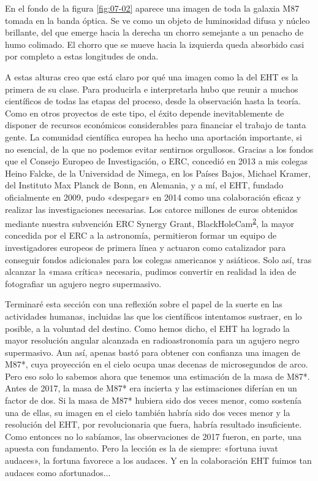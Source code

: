 En el fondo de la figura \ref{fig:07-02} aparece una imagen de toda la galaxia M87 tomada en la banda óptica. Se ve como un objeto de luminosidad difusa y núcleo brillante, del que emerge hacia la derecha un chorro semejante a un penacho de humo colimado. El chorro que se mueve hacia la izquierda queda absorbido casi por completo a estas longitudes de onda.

A estas alturas creo que está claro por qué una imagen como la del EHT es la primera de su clase. Para producirla e interpretarla hubo que reunir a muchos científicos de todas las etapas del proceso, desde la observación hasta la teoría. Como en otros proyectos de este tipo, el éxito depende inevitablemente de disponer de recursos económicos considerables para financiar el trabajo de tanta gente. La comunidad científica europea ha hecho una aportación importante, si no esencial, de la que no podemos evitar sentirnos orgullosos. Gracias a los fondos que el Consejo Europeo de Investigación, o ERC, concedió en 2013 a mis colegas Heino Falcke, de la Universidad de Nimega, en los Países Bajos, Michael Kramer, del Instituto Max Planck de Bonn, en Alemania, y a mí, el EHT, fundado oficialmente en 2009, pudo «despegar» en 2014 como una colaboración eficaz y realizar las investigaciones necesarias. Los catorce millones de euros obtenidos mediante nuestra subvención ERC Synergy Grant, BlackHoleCam\textsuperscript{\hyperlink{note:07-02}{2}}, la mayor concedida por el ERC a la astronomía, permitieron formar un equipo de investigadores europeos de primera línea y actuaron como catalizador para conseguir fondos adicionales para los colegas americanos y asiáticos. Solo así, tras alcanzar la «masa crítica» necesaria, pudimos convertir en realidad la idea de fotografiar un agujero negro supermasivo.

Terminaré esta sección con una reflexión sobre el papel de la suerte en las actividades humanas, incluidas las que los científicos intentamos sustraer, en lo posible, a la voluntad del destino. Como hemos dicho, el EHT ha logrado la mayor resolución angular alcanzada en radioastronomía para un agujero negro supermasivo. Aun así, apenas bastó para obtener con confianza una imagen de M87*, cuya proyección en el cielo ocupa unas decenas de microsegundos de arco. Pero eso solo lo sabemos ahora que tenemos una estimación de la masa de M87*. Antes de 2017, la masa de M87* era incierta y las estimaciones diferían en un factor de dos. Si la masa de M87* hubiera sido dos veces menor, como sostenía una de ellas, su imagen en el cielo también habría sido dos veces menor y la resolución del EHT, por revolucionaria que fuera, habría resultado insuficiente. Como entonces no lo sabíamos, las observaciones de 2017 fueron, en parte, una apuesta con fundamento. Pero la lección es la de siempre: «fortuna iuvat audaces», la fortuna favorece a los audaces. Y en la colaboración EHT fuimos tan audaces como afortunados...

